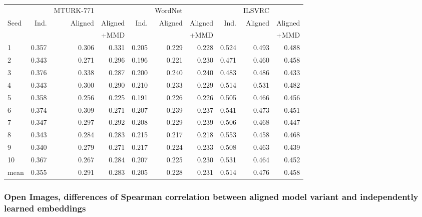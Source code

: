 \begin{table}[H]
\begin{tabular}{lrrrrrrrrr}
  \toprule
   &     &   MTURK-771        &               &      &    WordNet       &               &     &  ILSVRC           & \\
{Seed} &  Ind. &   Aligned &  Aligned  & Ind. &   Aligned &  Aligned  & Ind. &   Aligned &  Aligned   \\
{}     &              &           & +MMD      &            &            & +MMD      &             &           &   +MMD \\
\midrule
1    &     0.357 &  0.306 &   0.331 &     0.205 &  0.229 &    0.228 &   0.524 &  0.493 &  0.488  \\
2    &     0.343 &  0.271 &   0.296 &     0.196 &  0.221 &    0.230 &   0.471 &  0.460 &  0.458  \\
3    &     0.376 &  0.338 &   0.287 &     0.200 &  0.240 &    0.240 &   0.483 &  0.486 &  0.433  \\
4    &     0.343 &  0.300 &   0.290 &     0.210 &  0.233 &    0.229 &   0.514 &  0.531 &  0.482 \\
5    &     0.358 &  0.256 &   0.225 &     0.191 &  0.226 &    0.226 &   0.505 &  0.466 &  0.456  \\
6    &     0.374 &  0.309 &   0.271 &     0.207 &  0.239 &    0.237 &   0.541 &  0.473 &  0.451  \\
7    &     0.347 &  0.297 &   0.292 &     0.208 &  0.229 &    0.239 &   0.506 &  0.468 &  0.447  \\
8    &     0.343 &  0.284 &   0.283 &     0.215 &  0.217 &    0.218 &   0.553 &  0.458 &  0.468  \\
9    &     0.340 &  0.279 &   0.271 &     0.217 &  0.224 &    0.233 &   0.508 &  0.463 &  0.439  \\
10   &     0.367 &  0.267 &   0.284 &     0.207 &  0.225 &    0.230 &   0.531 &  0.464 &  0.452  \\
\midrule                                                                                         
mean &     0.355 &  0.291 &   0.283 &     0.205 &  0.228 &    0.231 &   0.514 &  0.476 &  0.458  \\
\bottomrule
\end{tabular}
\end{table}

\subsubsection{Open Images, differences of Spearman correlation between aligned model variant and independently learned embeddings}


